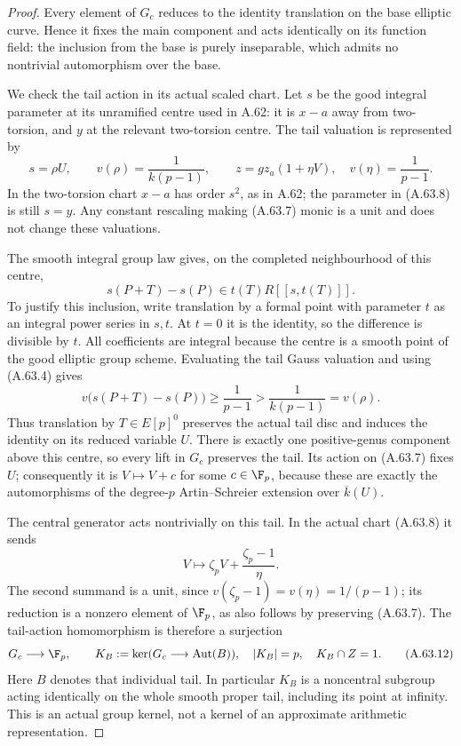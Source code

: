 \begin{proof}
Every element of \(G_c\) reduces to the identity translation
on the base elliptic curve. Hence it fixes the main component
and acts identically on its function field: the inclusion
from the base is purely inseparable, which admits no
nontrivial automorphism over the base.

We check the tail action in its actual scaled chart. Let
\(s\) be the good integral parameter at its unramified
centre used in A.62: it is \(x-a\) away from two-torsion,
and \(y\) at the relevant two-torsion centre. The tail
valuation is represented by
\[
 s=\rho U,\qquad
 v(\rho)=\frac1{k(p-1)},\qquad
 z=g z_a(1+\eta V),\quad v(\eta)=\frac1{p-1}.
                                                        \tag{A.63.8}
\]
In the two-torsion chart \(x-a\) has order \(s^2\), as
in A.62; the parameter in (A.63.8) is still \(s=y\).
Any constant rescaling making (A.63.7) monic is a unit and
does not change these valuations.

The smooth integral group law gives, on the completed
neighbourhood of this centre,
\[
                 s(P+T)-s(P)\in t(T)R[[s,t(T)]].        \tag{A.63.9}
\]
To justify this inclusion, write translation by a formal
point with parameter \(t\) as an integral power series
in \(s,t\). At \(t=0\) it is the identity, so the
difference is divisible by \(t\). All coefficients are
integral because the centre is a smooth point of the good
elliptic group scheme. Evaluating the tail Gauss valuation
and using (A.63.4) gives
\[
 v\bigl(s(P+T)-s(P)\bigr)\ge\frac1{p-1}
           >\frac1{k(p-1)}=v(\rho).                    \tag{A.63.10}
\]
Thus translation by \(T\in E[p]^0\) preserves the actual
tail disc and induces the identity on its reduced variable
\(U\). There is exactly one positive-genus component
above this centre, so every lift in \(G_c\) preserves the
tail. Its action on (A.63.7) fixes \(U\); consequently it
is \(V\mapsto V+c\) for some \(c\in\F_p\), because
these are exactly the automorphisms of the degree-\(p\)
Artin--Schreier extension over \(\overline k(U)\).

The central generator acts nontrivially on this tail. In
the actual chart (A.63.8) it sends
\[
       V\longmapsto\zeta_pV+\frac{\zeta_p-1}{\eta}.
                                                        \tag{A.63.11}
\]
The second summand is a unit, since
\(v(\zeta_p-1)=v(\eta)=1/(p-1)\); its reduction is a
nonzero element of \(\F_p\), as also follows by
preserving (A.63.7). The tail-action homomorphism is
therefore a surjection
\[
 G_c\longrightarrow\F_p,\qquad
 K_B:=\ker(G_c\longrightarrow\operatorname{Aut}(B)),
 \quad |K_B|=p,\quad K_B\cap Z=1.                       \tag{A.63.12}
\]
Here \(B\) denotes that individual tail. In particular
\(K_B\) is a noncentral subgroup acting identically on
the whole smooth proper tail, including its point at
infinity. This is an actual group kernel, not a kernel of
an approximate arithmetic representation.


\end{proof}
